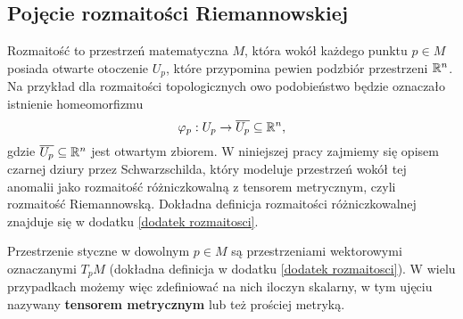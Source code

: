 \subsection{Pojęcie rozmaitości Riemannowskiej}


Rozmaitość to przestrzeń matematyczna $M$, która wokół każdego punktu $p \in M$ posiada otwarte otoczenie $U_p$, które przypomina pewien podzbiór przestrzeni $\mathbb{R}^n$. Na przykład dla rozmaitości topologicznych owo podobieństwo będzie oznaczało istnienie homeomorfizmu 
$$ \varphi_p: U_p \to \overline{U_p} \subseteq \mathbb{R}^n, $$
gdzie $\overline{U_p} \subseteq \mathbb{R}^n$ jest otwartym zbiorem. W niniejszej pracy zajmiemy się opisem czarnej dziury przez Schwarzschilda, który modeluje przestrzeń wokół tej anomalii jako rozmaitość różniczkowalną z tensorem metrycznym, czyli rozmaitość Riemannowską. Dokładna definicja rozmaitości różniczkowalnej znajduje się w dodatku \ref{dodatek rozmaitosci}.



Przestrzenie styczne w dowolnym $p\in M$ są przestrzeniami wektorowymi oznaczanymi $T_pM$ (dokładna definicja w {dodatku} \ref{dodatek rozmaitosci}). W wielu przypadkach możemy więc zdefiniować na nich iloczyn skalarny, w tym ujęciu nazywany \textbf{tensorem metrycznym} lub też prościej metryką.

